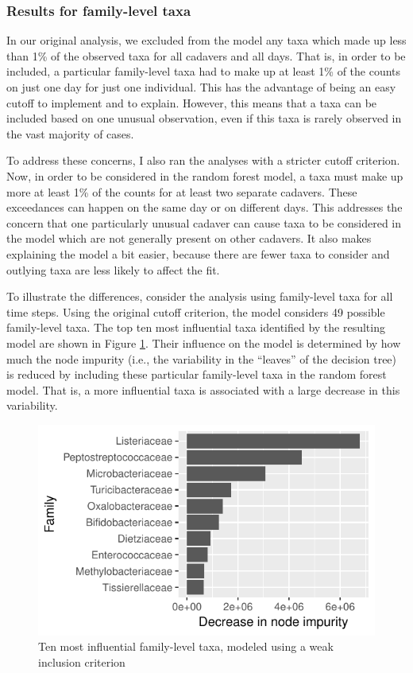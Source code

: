 \documentclass{article}
\begin{document}
\subsubsection{Results for family-level taxa}

In our original analysis, we excluded from the model any taxa which
made up less than 1\% of the observed taxa for all cadavers and all
days.  That is, in order to be included, a particular family-level
taxa had to make up at least 1\% of the counts on just one day for
just one individual.  This has the advantage of being an easy cutoff
to implement and to explain.  However, this means that a taxa can be
included based on one unusual observation, even if this taxa is rarely
observed in the vast majority of cases.

To address these concerns, I also ran the analyses with a stricter
cutoff criterion.  Now, in order to be considered in the random forest
model, a taxa must make up more at least 1\% of the counts for at
least two separate cadavers.  These exceedances can happen on the same
day or on different days.  This addresses the concern that one
particularly unusual cadaver can cause taxa to be considered in the
model which are not generally present on other cadavers.  It also
makes explaining the model a bit easier, because there are fewer taxa
to consider and outlying taxa are less likely to affect the fit.

To illustrate the differences, consider the analysis using
family-level taxa for all time steps.  Using the original cutoff
criterion, the model considers 49 possible family-level taxa.  The top
ten most influential taxa identified by the resulting model are shown
in Figure \ref{fig:infl_family_taxa_orig_crit}.  Their influence on the
model is determined by how much the node impurity (i.e., the
variability in the ``leaves'' of the decision tree) is reduced by
including these particular family-level taxa in the random forest
model.  That is, a more influential taxa is associated with a large
decrease in this variability.

\begin{figure}
  \centering
  \includegraphics{../../only_families/all_time_steps/cutoff_1perc/orig_units_all_data_families_barchart}
  \caption{Ten most influential family-level taxa, modeled using a weak inclusion criterion}
  \label{fig:infl_family_taxa_orig_crit}
\end{figure}
\end{document}
